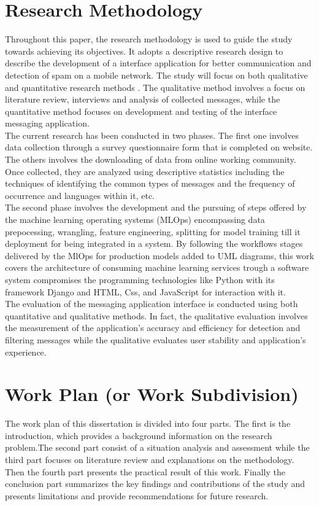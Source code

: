 \documentclass[12pt,a4paper, oneside]{book}
\begin{document}
	\section{Research Methodology}
	Throughout this paper, the research methodology is used to guide the study towards achieving its objectives. It adopts a descriptive research design to describe the development of a interface application for better communication and detection of spam on a mobile network. The study will focus on both qualitative and quantitative research methods \citep{creswell2014research}. The qualitative method  involves a focus on literature review, interviews and analysis of collected messages, while the quantitative method focuses on development and testing of the interface messaging application.\\
		
	The current research has been conducted in two phases. The first one involves data collection through a survey questionnaire form that is completed on website. The others involves the downloading of data from online working community. Once collected, they are analyzed using descriptive statistics \citep{bluman2017elementary} including the techniques of identifying the common types of messages and the frequency of occurrence and languages within it, etc.  \\
	
	The second phase involves the development and the pursuing of steps offered by the machine learning operating systems (MLOps) encompassing data prepocessing, wrangling, feature engineering, splitting for model training till it deployment for being integrated in a system. 
	By following the workflows stages delivered by the MlOps for production models added to UML diagrams, this work covers the architecture of consuming machine learning services trough a software system compromises the programming technologies like Python with its framework Django and HTML, Css, and JavaScript for interaction with it.\\
	
	The evaluation of the messaging application interface is conducted using both quantitative and qualitative methods. In fact, the qualitative evaluation involves the measurement of the application's accuracy and efficiency for detection and filtering messages while the qualitative evaluates user stability and application's experience.
	
	\section{Work Plan (or Work Subdivision)}
	The work plan of this dissertation is divided into four parts. The first is the introduction, which provides a background information on the research problem.The second part consist of a situation analysis and assessment while the third part focuses on literature review and explanations on the methodology. Then the fourth part presents the practical result of this work. Finally the conclusion part summarizes the key findings and contributions of the study and presents limitations and provide recommendations for future research. \\
		
\end{document}
